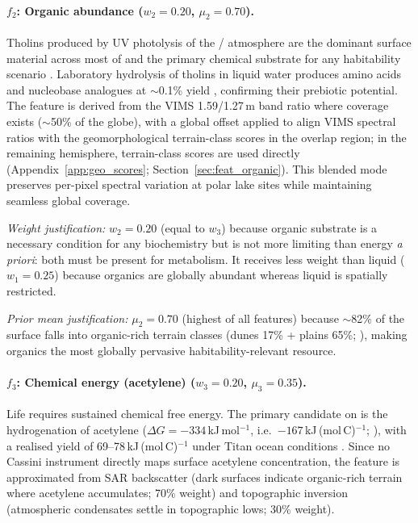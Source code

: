 \paragraph{$f_2$: Organic abundance ($w_2 = 0.20$, $\mu_2 = 0.70$).}
Tholins produced by UV photolysis of the / atmosphere are the dominant surface material across most of \titan{} and the primary chemical substrate for any habitability scenario \citep{MeyerDombard2025}.  Laboratory hydrolysis of tholins in liquid water produces amino acids and nucleobase analogues at $\sim$0.1\% yield \citep{Neish2010}, confirming their prebiotic potential.  The feature is derived from the VIMS 1.59/1.27\,\textmu{}m band ratio where coverage exists ($\sim$50\% of the globe), with a global offset applied to align VIMS spectral ratios with the \citet{Lopes2019} geomorphological terrain-class scores in the overlap region; in the remaining hemisphere, terrain-class scores are used directly (Appendix~\ref{app:geo_scores}; Section~\ref{sec:feat_organic}).  This blended mode preserves per-pixel spectral variation at polar lake sites while maintaining seamless global coverage.

\textit{Weight justification:} $w_2 = 0.20$ (equal to $w_3$) because organic substrate is a necessary condition for any biochemistry but is not more limiting than energy \textit{a priori}: both must be present for metabolism.  It receives less weight than liquid ($w_1 = 0.25$) because organics are globally abundant whereas liquid is spatially restricted.

\textit{Prior mean justification:} $\mu_2 = 0.70$ (highest of all features) because $\sim$82\% of the surface falls into organic-rich terrain classes (dunes 17\% + plains 65\%; \citealt{Malaska2025}), making organics the most globally pervasive habitability-relevant resource.

\paragraph{$f_3$: Chemical energy (acetylene) ($w_3 = 0.20$, $\mu_3 = 0.35$).}
Life requires sustained chemical free energy.  The primary candidate on \titan{} is the hydrogenation of acetylene ($\Delta G = -334$\,kJ\,mol$^{-1}$, i.e.\ $-167$\,kJ\,(mol\,C)$^{-1}$; \citealt{McKaySmith2005}), with a realised yield of 69--78\,kJ\,(mol\,C)$^{-1}$ under Titan ocean conditions \citep{Yanez2024}.  Since no Cassini instrument directly maps surface acetylene concentration, the feature is approximated from SAR backscatter (dark surfaces indicate organic-rich terrain where acetylene accumulates; 70\% weight) and topographic inversion (atmospheric condensates settle in topographic lows; 30\% weight).

